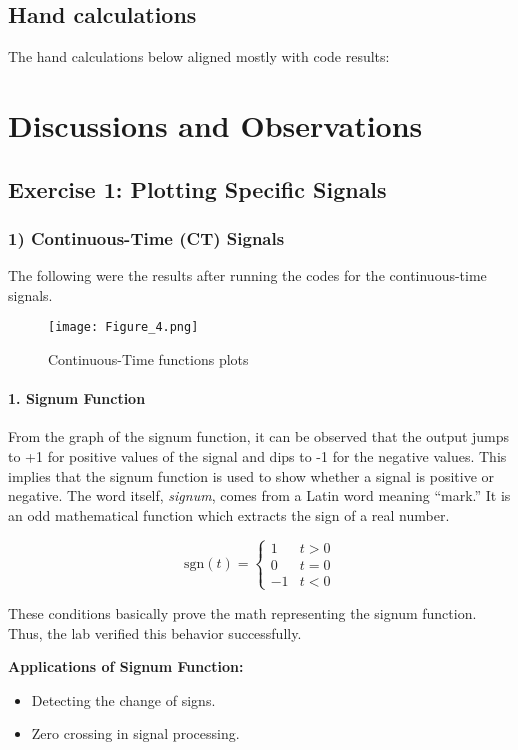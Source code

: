 \documentclass[12pt]{article}
\begin{document}
\subsection{Hand calculations}
The hand calculations below aligned mostly with code results:

\section{Discussions and Observations}

\subsection{Exercise 1: Plotting Specific Signals}

\subsubsection{1) Continuous-Time (CT) Signals}
The following were the results after running the codes for the continuous-time signals.
\begin{figure}[h]
    \centering
    \texttt{[image: Figure\_4.png]}
    \caption{Continuous-Time functions plots}
    \label{fig:signum}
\end{figure}

\paragraph{1. Signum Function}
From the graph of the signum function, it can be observed that the output jumps to +1 for positive values of the signal and dips to -1 for the negative values. This implies that the signum function is used to show whether a signal is positive or negative. The word itself, \textit{signum}, comes from a Latin word meaning “mark.” It is an odd mathematical function which extracts the sign of a real number.

\[
\text{sgn}(t) = 
\begin{cases}
1 & t > 0 \\
0 & t = 0 \\
-1 & t < 0
\end{cases}
\]

These conditions basically prove the math representing the signum function. Thus, the lab verified this behavior successfully.

\textbf{Applications of Signum Function:}
\begin{itemize}
    \item Detecting the change of signs.
    \item Zero crossing in signal processing.
\end{itemize}
\end{document}
